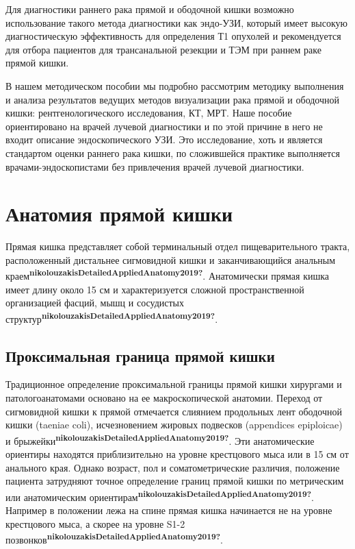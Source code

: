 \documentclass[
  russian,
  12pt,
  a4paper,
]{report}
\begin{document}
Для диагностики раннего рака прямой и ободочной кишки возможно
использование такого метода диагностики как эндо-УЗИ, который имеет
высокую диагностическую эффективность для определения Т1 опухолей и
рекомендуется для отбора пациентов для трансанальной резекции и ТЭМ при
раннем раке прямой кишки.

В нашем методическом пособии мы подробно рассмотрим методику выполнения
и анализа результатов ведущих методов визуализации рака прямой и
ободочной кишки: рентгенологического исследования, КТ, МРТ. Наше пособие
ориентировано на врачей лучевой диагностики и по этой причине в него не
входит описание эндоскопического УЗИ. Это исследование, хоть и является
стандартом оценки раннего рака кишки, по сложившейся практике
выполняется врачами-эндоскопистами без привлечения врачей лучевой
диагностики.

\chapter{Анатомия прямой
кишки}\label{ux430ux43dux430ux442ux43eux43cux438ux44f-ux43fux440ux44fux43cux43eux439-ux43aux438ux448ux43aux438}

Прямая кишка представляет собой терминальный отдел пищеварительного
тракта, расположенный дистальнее сигмовидной кишки и заканчивающийся
анальным
краем\textsuperscript{\textbf{nikolouzakisDetailedAppliedAnatomy2019?}}.
Анатомически прямая кишка имеет длину около 15 см и характеризуется
сложной пространственной организацией фасций, мышц и сосудистых
структур\textsuperscript{\textbf{nikolouzakisDetailedAppliedAnatomy2019?}}.

\section{Проксимальная граница прямой
кишки}\label{ux43fux440ux43eux43aux441ux438ux43cux430ux43bux44cux43dux430ux44f-ux433ux440ux430ux43dux438ux446ux430-ux43fux440ux44fux43cux43eux439-ux43aux438ux448ux43aux438}

Традиционное определение проксимальной границы прямой кишки хирургами и
патологоанатомами основано на ее макроскопической анатомии. Переход от
сигмовидной кишки к прямой отмечается слиянием продольных лент ободочной
кишки (taeniae coli), исчезновением жировых подвесков (appendices
epiploicae) и
брыжейки\textsuperscript{\textbf{nikolouzakisDetailedAppliedAnatomy2019?}}.
Эти анатомические ориентиры находятся приблизительно на уровне
крестцового мыса или в 15 см от анального края. Однако возраст, пол и
соматометрические различия, положение пациента затрудняют точное
определение границ прямой кишки по метрическим или анатомическим
ориентирам\textsuperscript{\textbf{nikolouzakisDetailedAppliedAnatomy2019?}}.
Например в положении лежа на спине прямая кишка начинается не на уровне
крестцового мыса, а скорее на уровне S1-2
позвонков\textsuperscript{\textbf{nikolouzakisDetailedAppliedAnatomy2019?}}.
\end{document}
